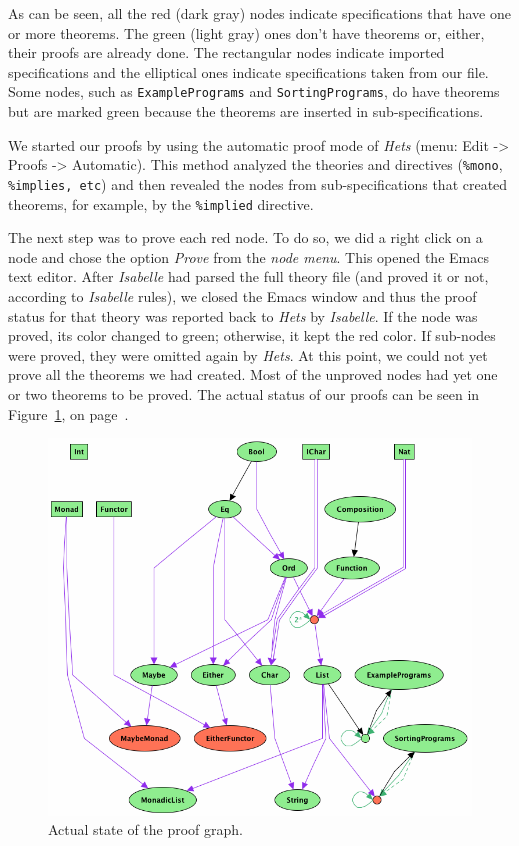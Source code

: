 \documentclass[12pt,twoside]{article}
\numberwithin{spec}{subsection}
\numberwithin{proof}{subsection}
\numberwithin{figure}{subsection}
\numberwithin{code}{subsection}
\newcommand{\citeFig}[1]{Figure~\ref{#1}, on page~\pageref{#1}}
\begin{document}
As can be seen, all the red (dark gray) nodes indicate specifications that have one or more theorems. The green (light gray) ones don't have theorems or, either, their proofs are already done. The rectangular nodes indicate imported specifications and the elliptical ones indicate specifications taken from our file. Some nodes, such as \verb.ExamplePrograms. and \verb.SortingPrograms., do have theorems but are marked green because the theorems are inserted in sub-specifications.

We started our proofs by using the automatic proof mode of \textit{Hets} (menu: Edit -> Proofs -> Automatic). This method analyzed the theories and directives (\verb.%mono., \verb.%implies, etc.) and then revealed the nodes from sub-specifications that created theorems, for example, by the \verb.%implied. directive.

The next step was to prove each red node. To do so, we did a right click on a node and chose the option \textit{Prove} from the \textit{node menu}. This opened the Emacs text editor. After \textit{Isabelle} had parsed the full theory file (and proved it or not, according to \textit{Isabelle} rules), we closed the Emacs window and thus the proof status for that theory was reported back to \textit{Hets} by \textit{Isabelle}. If the node was proved, its color changed to green; otherwise, it kept the red color. If sub-nodes were proved, they were omitted again by \textit{Hets}. At this point, we could not yet prove all the theorems we had created. Most of the unproved nodes had yet one or two theorems to be proved. The actual status of our proofs can be seen in \citeFig{fig:Status}.

\begin{figure}[htp]
\includegraphics[scale=0.6]{ProofEnd}
\caption{Actual state of the proof graph.}
\label{fig:Status}
\end{figure}
\end{document}
